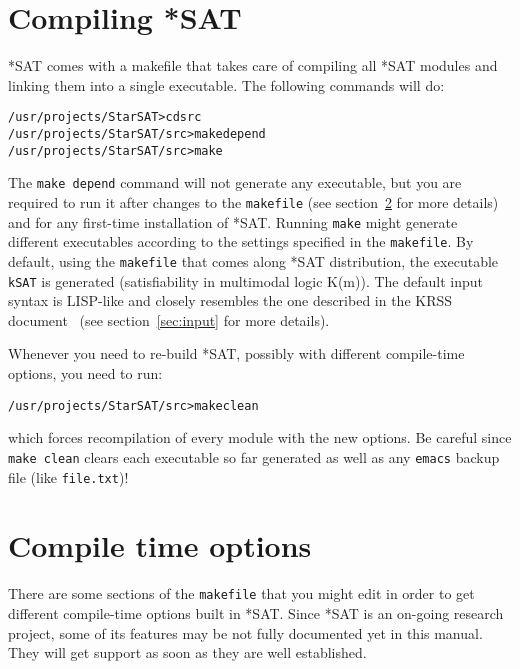 \documentclass[12pt]{report}
\begin{document}
\section{Compiling *SAT}
\label{sec:starsat}

*SAT comes with a makefile that takes care of compiling all *SAT
modules and linking them into a single executable. 
The following commands will do:
\begin{alltt}
/usr/projects/StarSAT>cd src
/usr/projects/StarSAT/src>make depend
/usr/projects/StarSAT/src>make 
\end{alltt}

The {\tt make depend} command will not generate any
executable, but you are required to run it after changes to the
{\tt makefile} (see section~\ref{sec:options} for more details) and
for any first-time installation of *SAT.
Running {\tt make} might generate different executables according to the settings
specified in the {\tt makefile}. By default, using the {\tt makefile}
that comes along *SAT distribution, the executable {\tt kSAT}
is generated (satisfiability in multimodal logic K(m)). The default input
syntax is LISP-like and closely resembles the one described in the
KRSS document~\cite{pat93a} (see section~\ref{sec:input} for more
details).

Whenever you need to re-build *SAT, possibly with different
compile-time options, you need to run:
\begin{alltt}
/usr/projects/StarSAT/src>make clean
\end{alltt}
which forces recompilation of every module with the new options. Be
careful since {\tt make clean} clears each executable so far generated
as well as any {\tt emacs} backup file (like {\tt file.txt})!

\section{Compile time options}
\label{sec:options}

There are some sections of the {\tt makefile} that you might 
edit in order to get different compile-time options
built in *SAT. Since *SAT is an on-going research project, some of its
features may be not fully documented yet in this manual. They will get
support as soon as they are well established. 
\end{document}
